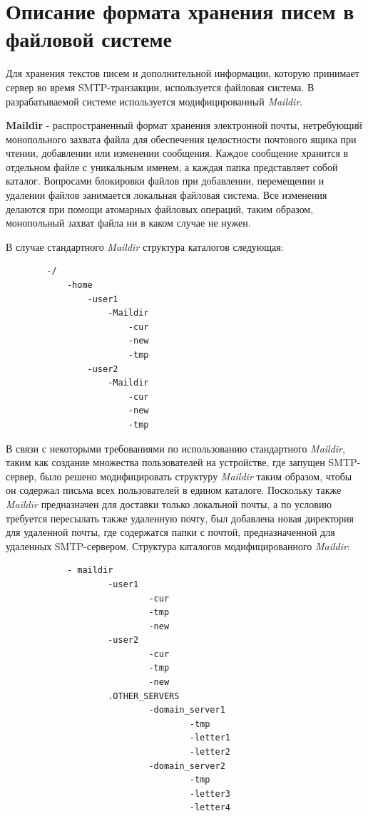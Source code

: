 \documentclass[a4paper,12pt]{report}
\begin{document}
    	\section{Описание формата хранения писем в файловой системе}
    	
	Для хранения текстов писем и дополнительной информации, которую принимает сервер во время SMTP-транзакции, используется файловая система. В разрабатываемой системе используется модифицированный \textit{Maildir}.
	
	\textbf{Maildir} - распространенный формат хранения электронной почты, нетребующий монопольного захвата файла для обеспечения целостности почтового ящика при чтении, добавлении или изменении сообщения. Каждое сообщение хранится в отдельном файле с уникальным именем, а каждая папка представляет собой каталог. Вопросами блокировки файлов при добавлении, перемещении и удалении файлов занимается локальная файловая система. Все изменения делаются при помощи атомарных файловых операций, таким образом, монопольный захват файла ни в каком случае не нужен.

	В случае стандартного \textit{Maildir} структура каталогов следующая:
	\begin{Verbatim}
		-/
			-home
				-user1
					-Maildir
						-cur
						-new
						-tmp
				-user2
					-Maildir
						-cur
						-new
						-tmp

	\end{Verbatim}

	В связи с некоторыми требованиями по использованию стандартного \textit{Maildir}, таким как создание множества пользователей на устройстве, где запущен SMTP-сервер, было решено модифицировать структуру \textit{Maildir} таким образом, чтобы он содержал письма всех пользователей в едином каталоге. Поскольку также \textit{Maildir} предназначен для доставки только локальной почты, а по условию требуется пересылать также удаленную почту, был добавлена новая директория для удаленной почты, где содержатся папки с почтой, предназначенной для удаленных SMTP-сервером. Структура каталогов модифицированного \textit{Maildir}:
        
    	\begin{verbatim}
        	- maildir
                	-user1
                        	-cur
                        	-tmp
                        	-new
                	-user2
                        	-cur
                        	-tmp
                        	-new
                	.OTHER_SERVERS
                        	-domain_server1
                                	-tmp
                                	-letter1
                                	-letter2
                        	-domain_server2
                                	-tmp
                                	-letter3
                                	-letter4
    	\end{verbatim}
\end{document}

